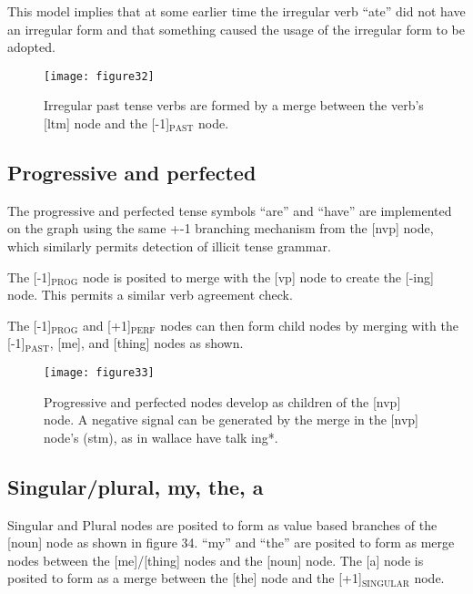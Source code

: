 \documentclass{clv3}
\begin{document}
This model implies that at some earlier time the irregular verb ``ate'' did not have an irregular form and that something caused the usage of the irregular form to be adopted.    




\begin{figure}[H]
\texttt{[image: figure32]}
\caption{Irregular past tense verbs are formed by a merge between the verb’s [ltm] node and the [-1]$_{\mathrm{PAST}}$ node. }
\end{figure}


\vspace{1cm}

\subsection{Progressive and perfected}



The progressive and perfected tense symbols ``are'' and ``have'' are implemented on the graph using the same +-1  branching mechanism from the [nvp] node, which similarly permits detection of illicit tense grammar.

The [-1]$_{\mathrm{PROG}}$ node is posited to merge with the [vp] node to create the [-ing] node.  This permits a similar verb agreement check.

The [-1]$_{\mathrm{PROG}}$ and [+1]$_{\mathrm{PERF}}$ nodes can then form child nodes by merging with the [-1]$_{\mathrm{PAST}}$, [me], and [thing] nodes as shown.   




\begin{figure}[H]
\texttt{[image: figure33]}
\caption{Progressive and perfected nodes develop as children of the [nvp] node.   A negative signal can be generated by the merge in the [nvp] node’s (stm), as in wallace have talk ing*.}
\end{figure}



\vspace{1cm}

\subsection{Singular/plural, my, the, a}


Singular and Plural nodes are posited to form as value based branches of the [noun] node as shown in figure 34.  ``my'' and ``the'' are posited to form as merge nodes between the [me]/[thing] nodes and the [noun] node.  The [a] node is posited to form as a merge between the [the] node and the [+1]$_{\mathrm{SINGULAR}}$ node.
\end{document}
